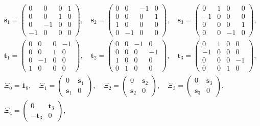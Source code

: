 \documentclass[
  10pt,
]{article}
\begin{document}
\[
\begin{aligned}
&\mathbf{s}_1 = \begin{pmatrix}0&0&0&1\\0&0&1&0\\0&-1&0&0\\-1&0&0&0\end{pmatrix},\quad
 \mathbf{s}_2 = \begin{pmatrix}0&0&-1&0\\0&0&0&1\\1&0&0&0\\0&-1&0&0\end{pmatrix},\quad
 \mathbf{s}_3 = \begin{pmatrix}0&1&0&0\\-1&0&0&0\\0&0&0&1\\0&0&-1&0\end{pmatrix},\\
&\mathbf{t}_1 = \begin{pmatrix}0&0&0&-1\\0&0&1&0\\0&-1&0&0\\1&0&0&0\end{pmatrix},\quad
 \mathbf{t}_2 = \begin{pmatrix}0&0&-1&0\\0&0&0&-1\\1&0&0&0\\0&1&0&0\end{pmatrix},\quad
 \mathbf{t}_3 = \begin{pmatrix}0&1&0&0\\-1&0&0&0\\0&0&0&-1\\0&0&1&0\end{pmatrix},\\
&\Xi_0 = \mathbf{1}_8,\quad
 \Xi_1 = \begin{pmatrix}0&\mathbf{s}_1\\ \mathbf{s}_1&0\end{pmatrix},\quad
 \Xi_2 = \begin{pmatrix}0&\mathbf{s}_2\\ \mathbf{s}_2&0\end{pmatrix},\quad
 \Xi_3 = \begin{pmatrix}0&\mathbf{s}_3\\ \mathbf{s}_3&0\end{pmatrix},\\
&\Xi_4 = \begin{pmatrix}0&\mathbf{t}_3\\ -\mathbf{t}_3&0\end{pmatrix},\quad

\end{aligned}\]
\end{document}

